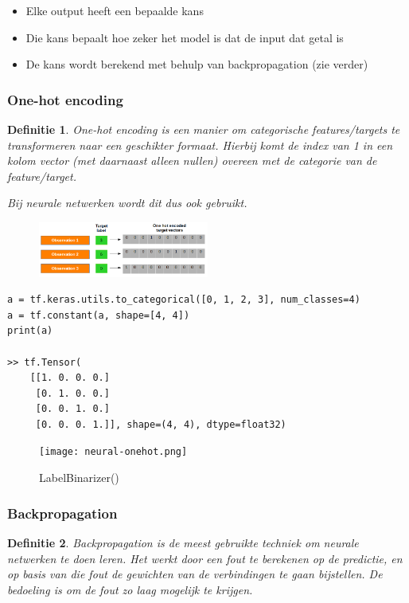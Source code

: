 \documentclass{article}
\newtheorem{theorem}{Definitie}[section]
\begin{document}
\begin{itemize}
    \item Elke output heeft een bepaalde kans
    \item Die kans bepaalt hoe zeker het model is dat de input dat getal is
    \item De kans wordt berekend met behulp van backpropagation (zie verder)
\end{itemize}

\subsubsection{One-hot encoding}

\begin{theorem}
    One-hot encoding is een manier om categorische features/targets te transformeren naar een
    geschikter formaat. Hierbij komt de index van 1 in een kolom vector (met daarnaast alleen
    nullen) overeen met de categorie van de feature/target.

    Bij neurale netwerken wordt dit dus ook gebruikt.
\end{theorem}

\begin{figure}[H]
    \centering
    \includegraphics[width=0.5\textwidth]{one-hot.png}
\end{figure}

\begin{verbatim}
a = tf.keras.utils.to_categorical([0, 1, 2, 3], num_classes=4)
a = tf.constant(a, shape=[4, 4])
print(a)

>> tf.Tensor(
    [[1. 0. 0. 0.]
     [0. 1. 0. 0.]
     [0. 0. 1. 0.]
     [0. 0. 0. 1.]], shape=(4, 4), dtype=float32)
\end{verbatim}

\begin{figure}[H]
    \centering
    \texttt{[image: neural-onehot.png]}
    \caption{LabelBinarizer()}
\end{figure}


\subsubsection{Backpropagation}

\begin{theorem}
    Backpropagation is de meest gebruikte techniek om neurale netwerken te doen leren. 
    Het werkt door een fout te berekenen op de predictie, en op basis van die fout de gewichten
    van de verbindingen te gaan bijstellen. De bedoeling is om de fout zo laag mogelijk te krijgen.
\end{theorem}
\end{document}
